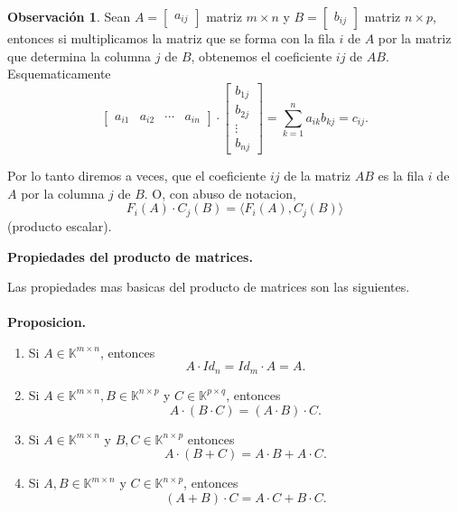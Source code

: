 \documentclass{article}
\theoremstyle{definition}
\theoremstyle{definition}
\newtheorem*{obs}{Observación}
\theoremstyle{remark}
\begin{document}
\begin{obs}
  Sean $A=\begin{bmatrix}a_{ij}\end{bmatrix}$ matriz $ m \times n$ y $B = \begin{bmatrix} b_{ij} \end{bmatrix}$ matriz $ n \times p$, entonces si multiplicamos la matriz que se forma con la fila $i$ de $A$ por la matriz que determina la columna $j$ de $B$, obtenemos el coeficiente $ij$ de $AB$. Esquematicamente \[
  \begin{bmatrix} a_{i1} & a_{i2} & \cdots & a_{in} \end{bmatrix} \cdot \begin{bmatrix} b_{1j} \\ b_{2j} \\ \vdots \\ b_{nj} \end{bmatrix} = \sum_{k= 1 } ^ {n} {a_{ik}b_{kj}}=c_{ij}.
\]
\end{obs}
Por lo tanto diremos a veces, que el coeficiente $ij$ de la matriz $AB$ es la fila $i$ de $A$ por la columna $j$ de $B$. O, con abuso de notacion, \[
F_i(A) \cdot C_j(B) = \langle F_i(A), C_j(B)\rangle
\]
(producto escalar).
\begin{center}
\textbf{Propiedades del producto de matrices.}
\end{center}
Las propiedades mas basicas del producto de matrices son las siguientes.\\\\
\textbf{Proposicion.}\begin{enumerate}[label=\textcolor{azulp2}{\arabic*.}]
  \item  Si $A \in \mathbb{K}^{m \times n}$, entonces \begin{equation}
      \tag{elemento neutro}
      A\cdot Id_n=Id_m \cdot A = A.
  \end{equation}
\item Si $A \in \mathbb{K}^{m \times n}, B\in \mathbb{K}^{n \times p}$ y $C \in \mathbb{K}^{p \times q}$, entonces \begin{equation} 
    \tag{asociativa}
    A\cdot(B\cdot C) = (A\cdot B)\cdot C.
  \end{equation}
\item Si $A \in \mathbb{K}^{m \times n}$ y $B,C \in \mathbb{K}^{n \times p}$ entonces \begin{equation} \tag{distributiva} A\cdot (B+C) =A\cdot B + A \cdot C. \end{equation}
\item Si $A,B \in \mathbb{K}^{m \times n}$ y $C \in \mathbb{K}^{n \times p}$, entonces \begin{equation} \tag{distributiva} (A+B)\cdot C = A\cdot C + B \cdot C.
  \end{equation}
\end{enumerate}
\end{document}
